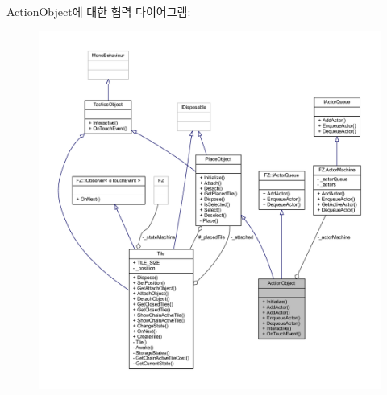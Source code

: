 Action\+Object에 대한 협력 다이어그램\+:
\nopagebreak
\begin{figure}[H]
\begin{center}
\leavevmode
\includegraphics[width=350pt]{class_action_object__coll__graph}
\end{center}
\end{figure}
